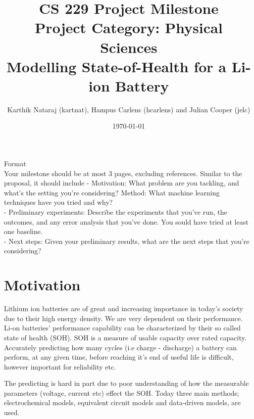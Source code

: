 
\usepackage[utf8]{inputenc}
\usepackage{hyperref}
\usepackage{cite}
\usepackage[a4paper, total={6in, 10in}]{geometry}


\title{%
    CS 229 Project Milestone \\
    Project Category: Physical Sciences \\
    Modelling State-of-Health for a Li-ion Battery}
\author{Karthik Nataraj (kartnat), Hampus Carlens (hcarlens) and Julian Cooper (jelc)}
\date{\today}



\maketitle


Format\\
Your milestone should be at most 3 pages, excluding references. Similar to the proposal, it should include
- Motivation: What problem are you tackling, and what's the setting you're considering?
Method: What machine learning techniques have you tried and why?\\

- Preliminary experiments: Describe the experiments that you've run, the outcomes, and any error analysis that you've done. You sould have tried at least one baseline.\\

- Next steps: Given your preliminary results, what are the next steps that you're considering?


\section{Motivation}
Lithium ion batteries are of great and increasing importance in today's society due to their high energy density. We are very dependent on their performance. Li-on batteries' performance capability can be characterized by their so called state of health (SOH). SOH is a measure of usable capacity over rated capacity. Accurately predicting how many cycles (i.e charge - discharge) a battery can perform, at any given time, before reaching it’s end of useful life is difficult, however important for reliability etc. 

The predicting is hard in part due to poor understanding of how the measurable parameters (voltage, current etc) effect the SOH. Today three main methods; electrochemical models, equivalent circuit models and data-driven models, are used.

